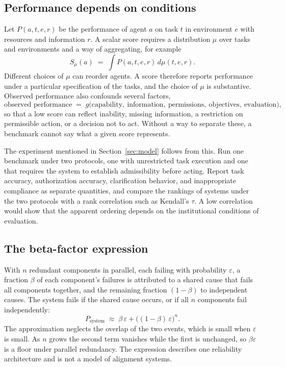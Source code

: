 \documentclass[11pt]{article}
\begin{document}
\subsection{Performance depends on conditions}

Let $P(a,t,e,r)$ be the performance of agent $a$ on task $t$ in environment $e$ with resources and information $r$. A scalar score requires a distribution $\mu$ over tasks and environments and a way of aggregating, for example
\[
S_\mu(a)\;=\;\int P(a,t,e,r)\,d\mu(t,e,r).
\]
Different choices of $\mu$ can reorder agents. A score therefore reports performance under a particular specification of the tasks, and the choice of $\mu$ is substantive. Observed performance also confounds several factors,
\[
\text{observed performance}\;=\;g\bigl(\text{capability},\ \text{information},\ \text{permissions},\ \text{objectives},\ \text{evaluation}\bigr),
\]
so that a low score can reflect inability, missing information, a restriction on permissible action, or a decision not to act. Without a way to separate these, a benchmark cannot say what a given score represents.

The experiment mentioned in Section~\ref{sec:model} follows from this. Run one benchmark under two protocols, one with unrestricted task execution and one that requires the system to establish admissibility before acting. Report task accuracy, authorization accuracy, clarification behavior, and inappropriate compliance as separate quantities, and compare the rankings of systems under the two protocols with a rank correlation such as Kendall's $\tau$. A low correlation would show that the apparent ordering depends on the institutional conditions of evaluation.

\subsection{The beta-factor expression}

With $n$ redundant components in parallel, each failing with probability $\varepsilon$, a fraction $\beta$ of each component's failures is attributed to a shared cause that fails all components together, and the remaining fraction $(1-\beta)$ to independent causes. The system fails if the shared cause occurs, or if all $n$ components fail independently:
\[
P_{\text{system}}\;\approx\;\beta\,\varepsilon+\bigl((1-\beta)\,\varepsilon\bigr)^{n}.
\]
The approximation neglects the overlap of the two events, which is small when $\varepsilon$ is small. As $n$ grows the second term vanishes while the first is unchanged, so $\beta\varepsilon$ is a floor under parallel redundancy. The expression describes one reliability architecture and is not a model of alignment systems.
\end{document}
